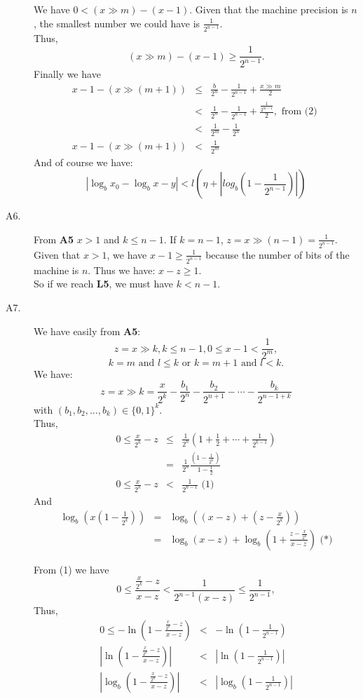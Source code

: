 \documentclass[a4paper,12pt]{article}
\begin{document}
\begin{description}
We have $0 < (x \gg m) - (x-1)$. Given that the machine precision is $n$, the
smallest number we could have is $\frac{1}{2^{n-1}}$.\\
Thus, \[(x \gg m) - (x-1) \ge \frac{1}{2^{n-1}}.\]
Finally we have
\begin{eqnarray*}
x-1-(x\gg(m+1)) & \le & \frac{b}{2^n} - \frac{1}{2^{n-1}} + \frac{x \gg m}{2}\\
& < & \frac{1}{2^n} - \frac{1}{2^{n-1}} + \frac{\frac{1}{2^{m-1}}}{2},
\mbox{ from (2) } \\
& < & \frac{1}{2^m} - \frac{1}{2^n} \\
x-1-(x \gg (m+1)) & < & \frac{1}{2^m}
\end{eqnarray*}
And of course we have:
\[|\log_bx_0 - \log_bx - y| < l\left(\eta +
\left|log_b\left(1 - \frac{1}{2^{n-1}}\right) \right| \right)\]

\item[A6.]
From \textbf{A5} $x > 1$ and $k \le n-1$.  If $k = n-1$, 
$z = x \gg (n-1) = \frac{1}{2^{n-1}}$.  Given that $x > 1$, we have 
$x - 1 \ge \frac{1}{2^{n-1}}$ because the number of bits of the machine is $n$.
Thus we have: $x - z \ge 1$.\\
So if we reach \textbf{L5}, we must have $k < n-1$.

\item[A7.]
We have easily from \textbf{A5}: 
\[z = x \gg k, k \le n-1, 0 \le x-1 < \frac{1}{2^m},\]
\[ k = m \mbox{ and } l \le k \mbox{ or } k=m+1 \mbox{ and } l<k.\]
We have:
\[z = x \gg k = \frac{x}{2^k} - \frac{b_1}{2^n} - \frac{b_2}{2^{n+1}} -
\cdots - \frac{b_k}{2^{n-1+k}}\]
with $(b_1, b_2, \ldots, b_k) \in \{0, 1\}^k$.\\
Thus,
\begin{eqnarray*}
0 \le \frac{x}{2^k} - z & \le & 
\frac{1}{2^n} \left(1 + \frac{1}{2} + \cdots + \frac{1}{2^{k-1}}\right)\\&=&
\frac{1}{2^n} \frac{\left(1 - \frac{1}{2^k}\right)}{1-\frac{1}{2}}\\
0 \le \frac{x}{2^k} - z & < & \frac{1}{2^{n-1}} \mbox{ (1)}
\end{eqnarray*}
And
\begin{eqnarray*}
\log_b\left(x \left(1 - \frac{1}{2^k}\right) \right) &=&
\log_b\left((x-z) + \left(z - \frac{x}{2^k}\right) \right)\\ &=&
\log_b(x-z) + \log_b\left(1+ \frac{z-\frac{x}{2^k}}{x-z}\right) \mbox{ (*)}
\end{eqnarray*}

From (1) we have
\[0 \le \frac{\frac{x}{2^k}-z}{x-z} < \frac{1}{2^{n-1}(x-z)} 
\le \frac{1}{2^{n-1}} ,\]
Thus,
\begin{eqnarray*}
0 \le -\ln \left(1 - \frac{\frac{x}{2^k}-z}{x-z} \right)
&<& -\ln \left(1 - \frac{1}{2^{n-1}}\right)\\
\left|\ln \left(1 - \frac{\frac{x}{2^k}-z}{x-z} \right)\right|
&<& \left|\ln \left(1 - \frac{1}{2^{n-1}}\right)\right|\\
\left|\log_b \left(1 - \frac{\frac{x}{2^k}-z}{x-z} \right)\right|
&<& \left|\log_b \left(1 - \frac{1}{2^{n-1}}\right)\right|
\end{eqnarray*}


\end{description}
\end{document}

